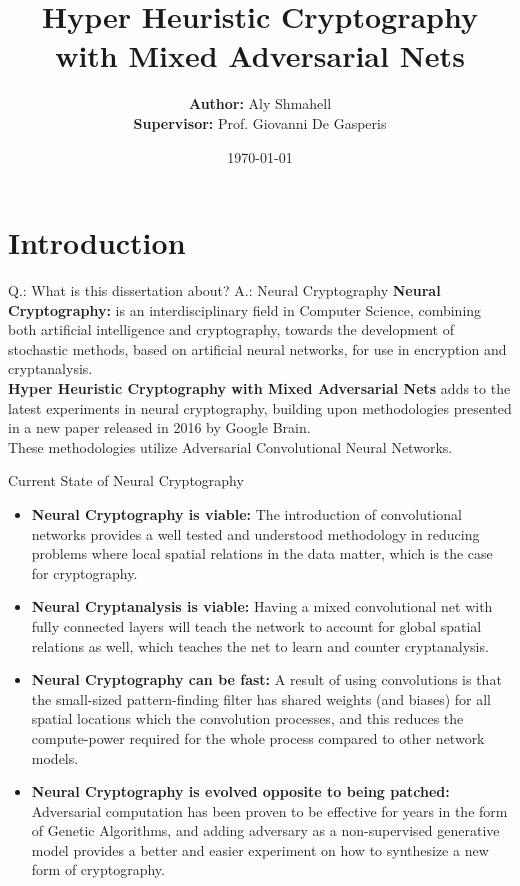 \documentclass{beamer}
\title{Hyper Heuristic Cryptography with Mixed Adversarial Nets}
\date{\today}
\author{\textbf{Author:} Aly Shmahell \\ \textbf{Supervisor:} Prof. Giovanni De Gasperis}
\institute{University of L'Aquila}
\begin{document}
	\maketitle
	\section{Introduction}
		\begin{frame}{Q.: What is this dissertation about? A.: Neural Cryptography}
			\textbf{Neural Cryptography:} is an interdisciplinary field in Computer Science, combining both artificial intelligence and cryptography, towards the development of stochastic methods,
			based on artificial neural networks, for use in encryption and cryptanalysis.\\
			\textbf{Hyper Heuristic Cryptography with Mixed Adversarial Nets} adds to the latest experiments in neural cryptography, building upon methodologies presented in a new paper released in 2016 by Google Brain.~\citep{DBLP:journals/corr/AbadiA16}\\
			These methodologies utilize Adversarial Convolutional Neural Networks.
		\end{frame}
		\begin{frame}{Current State of Neural Cryptography}
			\scriptsize{\begin{itemize}
				\item \textbf{Neural Cryptography is viable:} The introduction of convolutional networks provides a well tested and understood methodology in reducing problems where local spatial relations in the data matter, which is the case for cryptography.
				\item \textbf{Neural Cryptanalysis is viable:} Having a mixed convolutional net with fully connected layers will teach the network to account for global spatial relations as well, which teaches the net to learn and counter cryptanalysis.
				\item \textbf{Neural Cryptography can be fast:} A result of using convolutions is that the small-sized pattern-finding filter has shared weights (and biases) for all spatial locations which the convolution processes, and this reduces the compute-power required for the whole process compared to other network models.
				\item \textbf{Neural Cryptography is evolved opposite to being patched:} Adversarial computation has been proven to be effective for years in the form of Genetic Algorithms, and adding adversary as a non-supervised generative model provides a better and easier experiment on how to synthesize a new form of cryptography.
			\end{itemize}}
		\end{frame}
\end{document}
